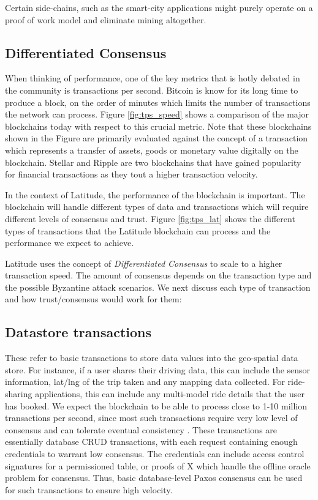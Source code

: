 Certain side-chains, such as the smart-city applications might purely operate on a proof of work model and eliminate
mining altogether.

\subsection{Differentiated Consensus}
When thinking of performance, one of the key metrics that is hotly debated in the community is transactions per second.
Bitcoin is know for its long time to produce a block, on the order of minutes which limits the number of transactions
the network can process. Figure \ref{fig:tps_speed} shows a comparison of the major blockchains today with respect to
this crucial metric. Note that these blockchains shown in the Figure are primarily evaluated against the concept of a
transaction which represents a transfer of assets, goods or monetary value digitally on the blockchain. Stellar and
Ripple are two blockchains that have gained popularity for financial transactions as they tout a higher transaction
velocity. 

In the context of Latitude, the performance of the blockchain is important. The blockchain will handle different types
of data and transactions which will require different levels of consensus and trust. Figure \ref{fig:tps_lat} shows the
different types of transactions that the Latitude blockchain can process and the performance we expect to achieve.

Latitude uses the concept of {\em Differentiated Consensus} to scale to a higher transaction speed. The amount of
consensus depends on the transaction type and the possible Byzantine attack scenarios. We next discuss each type of
transaction and how trust/consensus would work for them:

\subsection{Datastore transactions}
These refer to basic transactions to store data values into the geo-spatial data
store. For instance, if a user shares their driving data, this can include the sensor information, lat/lng of the trip
taken and any mapping data collected. For ride-sharing applications, this can include any multi-model ride details that
the user has booked. We expect the blockchain to be able to process close to 1-10 million transactions per second, since
most such transactions require very low level of consensus and can tolerate eventual consistency \cite{eventual_con}.
These transactions are essentially database CRUD transactions, with each request containing enough credentials to
warrant low consensus. The credentials can include access control signatures for a permissioned table, or proofs of X
which handle the offline oracle problem for consensus. Thus, basic database-level Paxos consensus can be used for such
transactions to ensure high velocity. 

